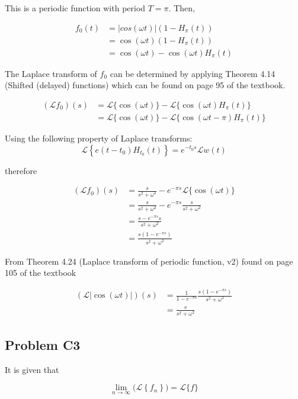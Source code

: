 \documentclass[a4paper,10pt,reqno]{amsart}
\numberwithin{equation}{section}
\newcommand{\lap}{\mathscr{L}}
\begin{document}
This is a periodic function with period $T = \pi$. Then, 

\begin{align}
f_0(t) &= |cos(\omega t)|(1 - H_\pi(t)) \\
&= \cos(\omega t)(1 - H_\pi(t)) \\
&= \cos(\omega t) - \cos(\omega t)H_\pi(t)
\end{align}

The Laplace transform of $f_0$ can be determined by applying Theorem 4.14 (Shifted (delayed) functions) which can be found on page 95 of the textbook.

\begin{align}
(\lap f_0)(s) &= \lap\{\cos(\omega t)\} - \lap\{\cos(\omega t)H_\pi(t)\} \\
&= \lap\{\cos(\omega t)\} - \lap\{\cos(\omega t - \pi)H_\pi(t)\}
\end{align}

Using the following property of Laplace transforms:
\begin{equation}
    \lap\left\{e(t - t_0)H_{t_0}(t)\right\} = e^{-t_0 s}\lap{w(t)}
\end{equation}

therefore

\begin{align}
     (\lap f_0)(s) &= \frac{s}{s^2 + \omega^2} - e^{-\pi s}\lap\{\cos(\omega t)\} \\
     &= \frac{s}{s^2 + \omega^2} - e^{-\pi s}\frac{s}{s^2 + \omega^2} \\
     &= \frac{s - e^{-\pi s}s}{s^2 + \omega^2} \\
     &= \frac{s(1 - e^{-\pi s})}{s^2 + \omega^2}
\end{align}

From Theorem 4.24 (Laplace transform of periodic function, v2) found on page 105 of the textbook

\begin{align}
(\lap|{\cos(\omega t)|})(s) &= \frac{1}{1 - e^{-\pi s}}\frac{s(1 - e^{-\pi s})}{s^2 + \omega^2} \\
&= \frac{s}{s^2 + \omega^2}
\end{align}


\subsection{Problem C3}\label{sec:c3}

It is given that

\begin{equation}\label{eq:pntwise_lap}
    \lim_{n \to \infty} \big(\lap\left\{f_n\right\}\big) = \lap\{f\}
\end{equation}
\vspace{1pt}
\end{document}
